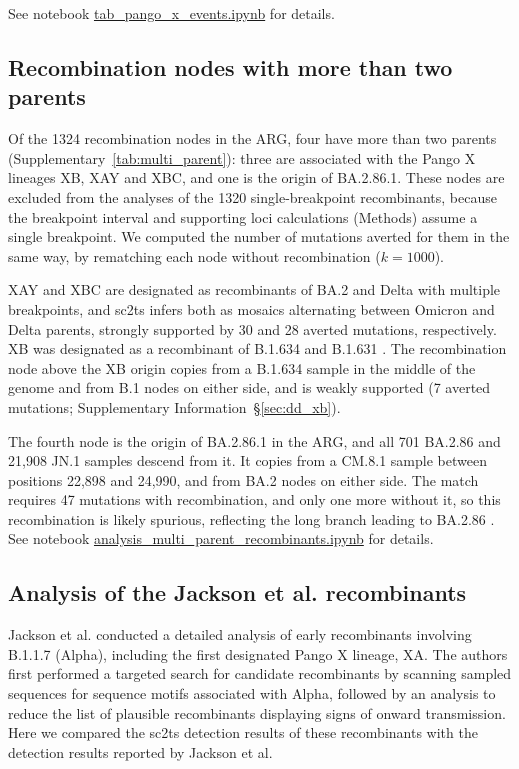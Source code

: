 \documentclass[12pt]{article}
\newcommand{\supref}[1]{Supplementary Information~\S\ref{#1}}
\newcommand{\siref}[1]{Supplementary~\ref{#1}}
\begin{document}
See notebook
\href{https://github.com/jeromekelleher/sc2ts-paper/blob/main/notebooks/tab\_pango\_x\_events.ipynb}
{tab\_pango\_x\_events.ipynb} for details.

\subsection{Recombination nodes with more than two parents}
\label{sec:multi_parent_recombinants}
Of the 1324 recombination nodes in the ARG, four have more than two parents
(\siref{tab:multi_parent}): three are associated with the Pango X lineages
XB, XAY and XBC, and one is the origin of BA.2.86.1.
These nodes are excluded from the analyses of the 1320 single-breakpoint
recombinants, because the breakpoint interval and supporting loci
calculations (Methods) assume a single breakpoint.
We computed the number of mutations averted for them in the same way,
by rematching each node without recombination ($k=1000$).

XAY and XBC are designated as recombinants of BA.2 and Delta with multiple
breakpoints, and sc2ts infers both as mosaics alternating between Omicron and
Delta parents, strongly supported by 30 and 28 averted mutations, respectively.
XB was designated as a recombinant of B.1.634 and B.1.631 \cite{Gutierrez2022}.
The recombination node above the XB origin copies from a B.1.634 sample in the
middle of the genome and from B.1 nodes on either side, and is weakly
supported (7 averted mutations; \supref{sec:dd_xb}).

The fourth node is the origin of BA.2.86.1 in the ARG, and all 701 BA.2.86
and 21,908 JN.1 samples descend from it.
It copies from a CM.8.1 sample between positions 22,898 and 24,990, and from
BA.2 nodes on either side.
The match requires 47 mutations with recombination, and only one more
without it, so this recombination is likely spurious, reflecting the long
branch leading to BA.2.86 \cite{Planas2024}.
See notebook
\href{https://github.com/jeromekelleher/sc2ts-paper/blob/main/notebooks/analysis\_multi\_parent\_recombinants.ipynb}
{analysis\_multi\_parent\_recombinants.ipynb} for details.

\subsection{Analysis of the Jackson et al. recombinants}
\label{sec:jackson_recombs}

Jackson et al.\cite{Jackson2021} conducted a detailed analysis of
early recombinants involving B.1.1.7 (Alpha),
including the first designated Pango X lineage, XA.
The authors first performed a targeted search for candidate recombinants by
scanning sampled sequences for sequence motifs associated with Alpha,
followed by an analysis to reduce the list of plausible recombinants
displaying signs of onward transmission.
Here we compared the sc2ts detection results of these recombinants
with the detection results reported by Jackson et al.
\end{document}
